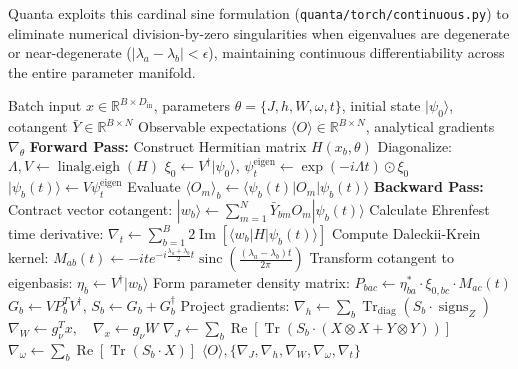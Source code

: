 \documentclass[aps,prx,twocolumn,superscriptaddress,nofootinbib]{revtex4-2}
\newcommand{\ket}[1]{|#1\rangle}
\newcommand{\bra}[1]{\langle#1|}
\newcommand{\Tr}{\operatorname{Tr}}
\begin{document}
Quanta exploits this cardinal sine formulation (\texttt{quanta/torch/continuous.py}) to eliminate numerical division-by-zero singularities when eigenvalues are degenerate or near-degenerate ($|\lambda_a - \lambda_b| < \epsilon$), maintaining continuous differentiability across the entire parameter manifold.

\begin{algorithm}[t]
\caption{Continuous Daleckii-Krein Autograd Engine}
\label{alg:daleckii_krein}
\begin{algorithmic}[1]
\Require Batch input $x \in \mathbb{R}^{B \times D_{\text{in}}}$, parameters $\theta = \{J, h, W, \omega, t\}$, initial state $\ket{\psi_0}$, cotangent $\bar{Y} \in \mathbb{R}^{B \times N}$
\Ensure Observable expectations $\langle O \rangle \in \mathbb{R}^{B \times N}$, analytical gradients $\nabla_\theta$
\State \textbf{Forward Pass:}
\State Construct Hermitian matrix $H(x_b, \theta)$
\State Diagonalize: $\Lambda, V \leftarrow \operatorname{linalg.eigh}(H)$
\State $\xi_0 \leftarrow V^\dagger \ket{\psi_0}$, \quad $\psi_t^{\text{eigen}} \leftarrow \exp(-i \Lambda t) \odot \xi_0$
\State $\ket{\psi_b(t)} \leftarrow V \psi_t^{\text{eigen}}$
\State Evaluate $\langle O_m \rangle_b \leftarrow \bra{\psi_b(t)} O_m \ket{\psi_b(t)}$
\State \textbf{Backward Pass:}
\State Contract vector cotangent: $\ket{w_b} \leftarrow \sum_{m=1}^N \bar{Y}_{bm} O_m \ket{\psi_b(t)}$
\State Calculate Ehrenfest time derivative:
\State \quad $\nabla_t \leftarrow \sum_{b=1}^B 2 \operatorname{Im}\left[ \bra{w_b} H \ket{\psi_b(t)} \right]$
\State Compute Daleckii-Krein kernel:
\State \quad $M_{ab}(t) \leftarrow -i t e^{-i \frac{\lambda_a+\lambda_b}{2}t} \operatorname{sinc}\left(\frac{(\lambda_a-\lambda_b)t}{2\pi}\right)$
\State Transform cotangent to eigenbasis: $\eta_b \leftarrow V^\dagger \ket{w_b}$
\State Form parameter density matrix:
\State \quad $P_{bac} \leftarrow \eta_{ba}^* \cdot \xi_{0, bc} \cdot M_{ac}(t)$
\State \quad $G_b \leftarrow V P_b^T V^\dagger$, \quad $S_b \leftarrow G_b + G_b^\dagger$
\State Project gradients:
\State \quad $\nabla_h \leftarrow \sum_b \operatorname{Tr}_{\text{diag}}(S_b \cdot \operatorname{signs}_Z)$
\State \quad $\nabla_W \leftarrow g_\nu^T x, \quad \nabla_x \leftarrow g_\nu W$
\State \quad $\nabla_J \leftarrow \sum_b \operatorname{Re}[\Tr(S_b \cdot (X \otimes X + Y \otimes Y))]$
\State \quad $\nabla_\omega \leftarrow \sum_b \operatorname{Re}[\Tr(S_b \cdot X)]$
\State \Return $\langle O \rangle, \{\nabla_J, \nabla_h, \nabla_W, \nabla_\omega, \nabla_t\}$
\end{algorithmic}
\end{algorithm}
\end{document}
